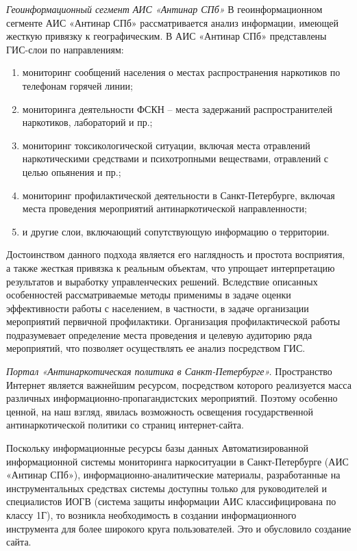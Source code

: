 \textit{Геоинформационный сегмент АИС «Антинар СПб»}
В геоинформационном сегменте АИС «Антинар СПб» рассматривается анализ
информации, имеющей жесткую привязку к географическим. В АИС «Антинар
СПб» представлены ГИС-слои по направлениям:
\begin{enumerate}
\item мониторинг сообщений населения о местах распространения наркотиков по
телефонам горячей линии;
\item мониторинга деятельности ФСКН – места задержаний распространителей
наркотиков, лабораторий и пр.;
\item мониторинг токсикологической ситуации, включая места отравлений
наркотическими средствами и психотропными веществами, отравлений с целью
опьянения и пр.;
\item мониторинг профилактической деятельности в Санкт-Петербурге, включая места
проведения мероприятий антинаркотической направленности;
\item и другие слои, включающий сопутствующую информацию о территории.
\end{enumerate}

Достоинством данного подхода является его наглядность и простота восприятия, а
также жесткая привязка к реальным объектам, что упрощает интерпретацию
результатов и выработку управленческих решений. Вследствие описанных
особенностей рассматриваемые методы применимы в задаче оценки эффективности
работы с населением, в частности, в задаче организации мероприятий первичной
профилактики. Организация профилактической работы подразумевает определение
места проведения и целевую аудиторию ряда мероприятий, что позволяет
осуществлять ее анализ посредством ГИС. 

\textit{Портал «Антинаркотическая политика в Санкт-Петербурге».} Пространство
Интернет является важнейшим ресурсом, посредством которого реализуется масса
различных информационно-пропагандистских мероприятий. Поэтому особенно ценной,
на наш взгляд, явилась возможность освещения государственной антинаркотической
политики со страниц интернет-сайта.  

Поскольку информационные ресурсы базы данных Автоматизированной информационной
системы мониторинга наркоситуации в Санкт-Петербурге (АИС «Антинар СПб»),
информационно-аналитические материалы, разработанные на инструментальных
средствах системы доступны только для руководителей и специалистов ИОГВ (система
защиты информации АИС классифицирована по классу 1Г), то возникла необходимость
в создании информационного инструмента для более широкого круга пользователей.
Это и обусловило создание сайта. 

